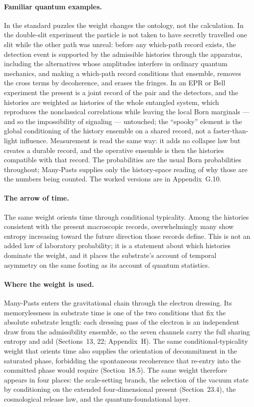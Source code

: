 \documentclass[11pt]{article}
\begin{document}
\paragraph{Familiar quantum examples.}
In the standard puzzles the weight changes the ontology, not the calculation. In the double-slit experiment the particle is not taken to have secretly travelled one slit while the other path was unreal: before any which-path record exists, the detection event is supported by the admissible histories through the apparatus, including the alternatives whose amplitudes interfere in ordinary quantum mechanics, and making a which-path record conditions that ensemble, removes the cross terms by decoherence, and erases the fringes. In an EPR or Bell experiment the present is a joint record of the pair and the detectors, and the histories are weighted as histories of the whole entangled system, which reproduces the nonclassical correlations while leaving the local Born marginals --- and so the impossibility of signaling --- untouched; the ``spooky'' element is the global conditioning of the history ensemble on a shared record, not a faster-than-light influence. Measurement is read the same way: it adds no collapse law but creates a durable record, and the operative ensemble is then the histories compatible with that record. The probabilities are the usual Born probabilities throughout; Many-Pasts supplies only the history-space reading of why those are the numbers being counted. The worked versions are in Appendix~G.10.

\paragraph{The arrow of time.}
The same weight orients time through conditional typicality. Among the histories consistent with the present macroscopic records, overwhelmingly many show entropy increasing toward the future direction those records define. This is not an added law of laboratory probability; it is a statement about which histories dominate the weight, and it places the substrate's account of temporal asymmetry on the same footing as its account of quantum statistics.

\paragraph{Where the weight is used.}
Many-Pasts enters the gravitational chain through the electron dressing. Its memorylessness in substrate time is one of the two conditions that fix the absolute substrate length: each dressing pass of the electron is an independent draw from the admissibility ensemble, so the seven channels carry the full sharing entropy and add (Sections~13, 22; Appendix~H). The same conditional-typicality weight that orients time also supplies the orientation of decommitment in the saturated phase, forbidding the spontaneous recoherence that re-entry into the committed phase would require (Section~18.5). The same weight therefore appears in four places: the scale-setting branch, the selection of the vacuum state by conditioning on the extended four-dimensional present (Section~23.4), the cosmological release law, and the quantum-foundational layer.
\end{document}
